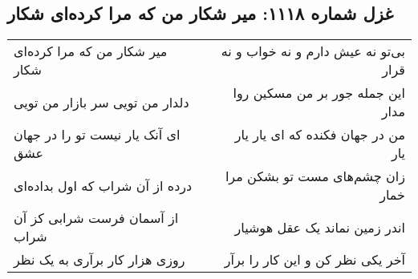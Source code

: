 \begin{center}
\section*{غزل شماره ۱۱۱۸: میر شکار من که مرا کرده‌ای شکار}
\label{sec:1118}
\begin{longtable}{l p{0.5cm} r}
میر شکار من که مرا کرده‌ای شکار
&&
بی‌تو نه عیش دارم و نه خواب و نه قرار
\\
دلدار من تویی سر بازار من تویی
&&
این جمله جور بر من مسکین روا مدار
\\
ای آنک یار نیست تو را در جهان عشق
&&
من در جهان فکنده که ای یار یار یار
\\
درده از آن شراب که اول بداده‌ای
&&
زان چشم‌های مست تو بشکن مرا خمار
\\
از آسمان فرست شرابی کز آن شراب
&&
اندر زمین نماند یک عقل هوشیار
\\
روزی هزار کار برآری به یک نظر
&&
آخر یکی نظر کن و این کار را برآر
\\
\end{longtable}
\end{center}
